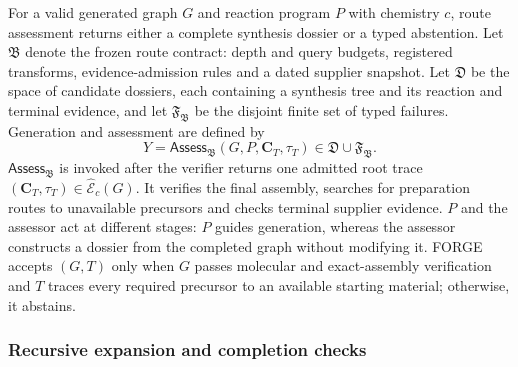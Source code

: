 \documentclass{article}
\theoremstyle{definition}
\begin{document}
For a valid generated graph $G$ and reaction program $P$ with chemistry $c$, route assessment
returns either a
complete synthesis dossier or a typed abstention.
Let $\mathfrak B$ denote the frozen route contract: depth and query budgets, registered transforms,
evidence-admission rules and a dated supplier snapshot. Let $\mathfrak D$ be the space of candidate
dossiers, each containing a synthesis tree and its reaction and terminal evidence, and let
$\mathfrak F_{\mathfrak B}$ be the disjoint finite set of typed failures.
Generation and assessment are defined by
\begin{equation}
    Y=\mathsf{Assess}_{\mathfrak B}(G,P,\mathbf C_T,\tau_T)
    \in\mathfrak D\cup\mathfrak F_{\mathfrak B}.
\end{equation}
$\mathsf{Assess}_{\mathfrak B}$ is invoked after the verifier returns one admitted root trace
$(\mathbf C_T,\tau_T)\in\widehat{\mathcal E}_c(G)$. It verifies the final assembly, searches for
preparation routes to unavailable precursors and checks terminal supplier evidence. $P$ and the assessor act at different stages: $P$ guides generation, whereas the assessor
constructs a dossier from the completed graph without modifying it.
FORGE accepts $(G,T)$ only when $G$ passes molecular and exact-assembly verification and $T$ traces
every required precursor to an available starting material; otherwise, it abstains.

\subsubsection{Recursive expansion and completion checks}
\end{document}
